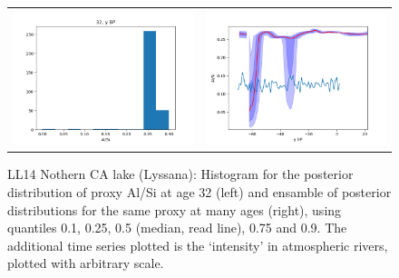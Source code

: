 \documentclass[12pt]{article}
\begin{document}
\begin{figure}
\begin{tabular}{c c}
\includegraphics[scale=0.5]{LL14_AlSi_32} &
\includegraphics[scale=0.5]{LL14_AlSi} \\
\end{tabular}
\caption{LL14 Nothern CA lake (Lyssana): Histogram for the posterior distribution of proxy Al/Si at age 32 (left) and ensamble of posterior distributions for the same proxy at many ages (right), using quantiles 0.1, 0.25, 0.5 (median, read line), 0.75 and 0.9.  The additional time series plotted is the `intensity' in atmospheric rivers, plotted with arbitrary scale.}

\end{figure}
\end{document}
